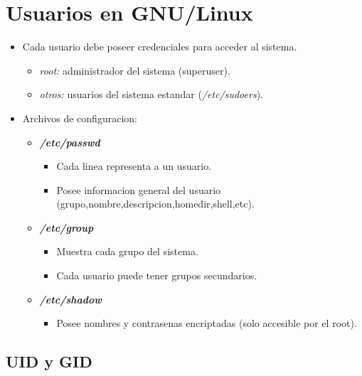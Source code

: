 \documentclass[11pt]{article}
\begin{document}
\section{Usuarios en GNU/Linux}
\begin{itemize}
    \item Cada usuario debe poseer credenciales para acceder al sistema.
        \begin{itemize}
            \item \textit{root:} administrador del sistema (superuser).
            \item \textit{otros:} usuarios del sistema estandar (\textit{/etc/sudoers}).
        \end{itemize}
    \item Archivos de configuracion:
        \begin{itemize}
            \item \textbf{\textit{/etc/passwd}}
                \begin{itemize}
                    \item Cada linea representa a un usuario.
                    \item Posee informacion general del usuario (grupo,nombre,descripcion,homedir,shell,etc).
                \end{itemize}
            \item \textbf{\textit{/etc/group}}
                \begin{itemize}
                    \item Muestra cada grupo del sistema.
                    \item Cada usuario puede tener grupos secundarios.
                \end{itemize}
            \item \textbf{\textit{/etc/shadow}}
                \begin{itemize}
                    \item Posee nombres y contrasenas encriptadas (solo accesible por el root).
                \end{itemize}
        \end{itemize}
\end{itemize}

\subsection{UID y GID}
\end{document}
